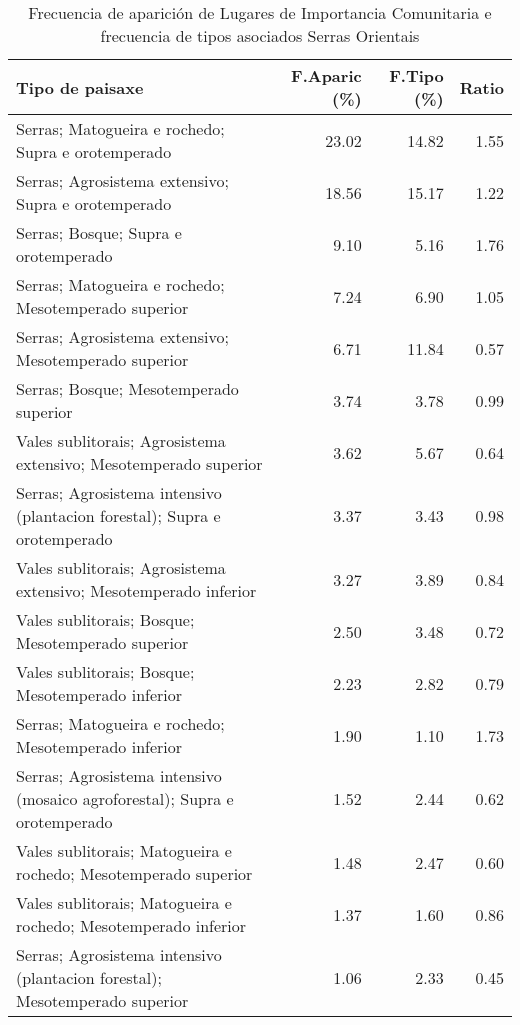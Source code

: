 \begin{table}[p]
\centering
\caption{Frecuencia de aparición de Lugares de Importancia Comunitaria e frecuencia de tipos asociados Serras Orientais} 
\label{vnatura5}
\begin{tabular}{lrrr}
  \hline
Tipo de paisaxe & F.Aparic (\%) & F.Tipo (\%) & Ratio \\ 
  \hline
Serras; Matogueira e rochedo; Supra e orotemperado & 23.02 & 14.82 & 1.55 \\ 
  Serras; Agrosistema extensivo; Supra e orotemperado & 18.56 & 15.17 & 1.22 \\ 
  Serras; Bosque; Supra e orotemperado & 9.10 & 5.16 & 1.76 \\ 
  Serras; Matogueira e rochedo; Mesotemperado superior & 7.24 & 6.90 & 1.05 \\ 
  Serras; Agrosistema extensivo; Mesotemperado superior & 6.71 & 11.84 & 0.57 \\ 
  Serras; Bosque; Mesotemperado superior & 3.74 & 3.78 & 0.99 \\ 
  Vales sublitorais; Agrosistema extensivo; Mesotemperado superior & 3.62 & 5.67 & 0.64 \\ 
  Serras; Agrosistema intensivo (plantacion forestal); Supra e orotemperado & 3.37 & 3.43 & 0.98 \\ 
  Vales sublitorais; Agrosistema extensivo; Mesotemperado inferior & 3.27 & 3.89 & 0.84 \\ 
  Vales sublitorais; Bosque; Mesotemperado superior & 2.50 & 3.48 & 0.72 \\ 
  Vales sublitorais; Bosque; Mesotemperado inferior & 2.23 & 2.82 & 0.79 \\ 
  Serras; Matogueira e rochedo; Mesotemperado inferior & 1.90 & 1.10 & 1.73 \\ 
  Serras; Agrosistema intensivo (mosaico agroforestal); Supra e orotemperado & 1.52 & 2.44 & 0.62 \\ 
  Vales sublitorais; Matogueira e rochedo; Mesotemperado superior & 1.48 & 2.47 & 0.60 \\ 
  Vales sublitorais; Matogueira e rochedo; Mesotemperado inferior & 1.37 & 1.60 & 0.86 \\ 
  Serras; Agrosistema intensivo (plantacion forestal); Mesotemperado superior & 1.06 & 2.33 & 0.45 \\ 
   \hline
\end{tabular}
\end{table}
